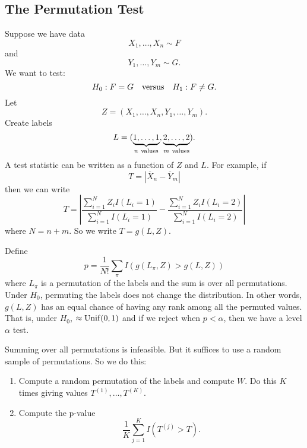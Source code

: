 \documentclass[twoside,12pt]{article}
\begin{document}
\subsection{The Permutation Test}
Suppose we have data
$$
X_1, \ldots, X_n \sim F
$$
and
$$
Y_1, \ldots, Y_m \sim G.
$$
We want to test:
$$
H_0: F=G \ \ \ {\rm versus}\ \ \ H_1: F\neq G.
$$
Let
$$
Z = (X_1,\ldots,X_n,Y_1,\ldots, Y_m).
$$
Create labels
$$
L = (\underbrace{1,\ldots, 1}_{n\ {\rm values}},
     \underbrace{2,\ldots, 2}_{m\ {\rm values}}).
$$
A test statistic can be written as a function of
$Z$ and $L$.
For example, if
$$
T = |\overline{X}_n - \overline{Y}_m|
$$
then we can write
$$
T = \left| \frac{\sum_{i=1}^{N} Z_i I(L_i=1)}{\sum_{i=1}^{N} I(L_i=1)} - 
\frac{\sum_{i=1}^{N} Z_i I(L_i=2)}{\sum_{i=1}^{N} I(L_i=2)} \right|
$$
where $N = n+m$.
So we write $T = g(L,Z)$.

Define
$$
p = \frac{1}{N!}\sum_{\pi} I( g(L_\pi,Z) > g(L,Z))
$$
where
$L_\pi$ is a permutation of the labels and the sum is over all permutations.
Under $H_0$, permuting the labels does not change the distribution.
In other words, $g(L,Z)$ has an equal chance of having any rank
among all the permuted values.
That is, under $H_0$,
$\approx {\rm Unif}(0,1)$ and
if we reject when $p < \alpha$,
then we have a level $\alpha$ test.

Summing over all permutations is infeasible.
But it suffices to use a random sample of permutations.
So we do this:
\begin{enumerate}
\item Compute a random permutation of the labels and compute $W$.
Do this $K$ times giving values $T^{(1)}, \ldots, T^{(K)}$.
\item Compute the p-value
$$
\frac{1}{K}\sum_{j=1}^K I(T^{(j)} > T).
$$
\end{enumerate}
\end{document}
